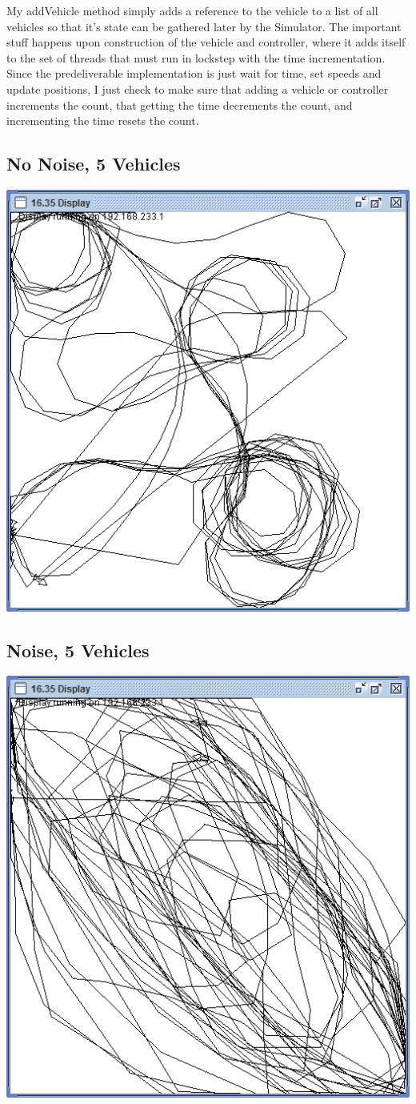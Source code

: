 \documentclass{article}
\begin{document}
My addVehicle method simply adds a reference to the vehicle to a list of all vehicles so that it's state can be gathered later by the Simulator.  The important stuff happens upon construction of the vehicle and controller, where it adds itself to the set of threads that must run in lockstep with the time incrementation.  Since the predeliverable implementation is just wait for time, set speeds and update positions, I just check to make sure that adding a vehicle or controller increments the count, that getting the time decrements the count, and incrementing the time resets the count.

\subsection{No Noise, 5 Vehicles}

\begin{center}
	\includegraphics[width=0.7\linewidth]{5nonoise}
\end{center}

\subsection{Noise, 5 Vehicles}

\begin{center}
	\includegraphics[width=0.7\linewidth]{5noise}
\end{center}
\end{document}
